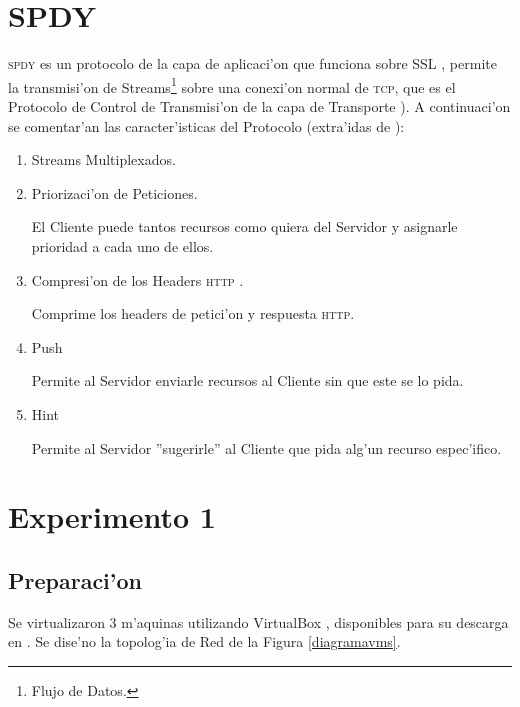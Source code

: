\documentclass[a4paper,11pt,twocolumn]{article}
\begin{document}
\section{SPDY}

\textsc{spdy}\cite{SPDYWhitepaper} es un protocolo de la capa de aplicaci'on \cite{illustratedTCPIP} que funciona sobre SSL \cite{rfcSSL}, permite la transmisi'on de Streams\footnote{Flujo de Datos.} sobre una conexi'on normal de \textsc{tcp}, que es el Protocolo de Control de Transmisi'on de la capa de Transporte \cite{illustratedTCPIP}). A continuaci'on se comentar'an las caracter'isticas del Protocolo (extra'idas de \cite{SPDYWhitepaper}):

\begin{enumerate}

\item Streams Multiplexados.

\item Priorizaci'on de Peticiones.

El Cliente puede tantos recursos como quiera del Servidor y asignarle prioridad a cada uno de ellos.

\item Compresi'on de los Headers \textsc{http} \cite{headersHTTP}.

Comprime los headers de petici'on y respuesta \textsc{http}.

\item Push

Permite al Servidor enviarle recursos al Cliente sin que este se lo pida.

\item Hint

Permite al Servidor ''sugerirle'' al Cliente que pida alg'un recurso espec'ifico.

\end{enumerate}

\section{Experimento 1}
\label{experimento1}
\subsection{Preparaci'on}

Se virtualizaron 3 m'aquinas utilizando VirtualBox \cite{virtualBox}, disponibles para su descarga en \cite{maqVirtuales}.
Se dise'no la topolog'ia de Red de la Figura \ref{diagramavms}.
\end{document}
